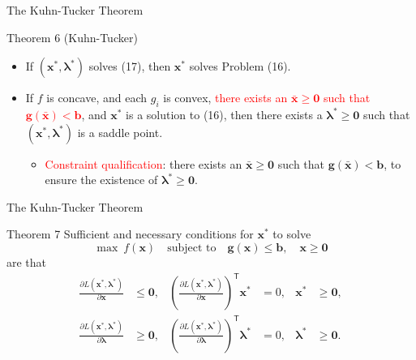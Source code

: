 \documentclass[aspectratio=169,hyperref,UTF8,CJK]{beamer}
\newcommand{\trans}{\mathsf{T}}
\newcommand{\vect}[1]{\boldsymbol{#1}}
\begin{document}
\begin{frame}{The Kuhn-Tucker Theorem}
  \small
  \begin{block}{Theorem 6 (Kuhn-Tucker)}
    \begin{itemize}
      \item If $(\vect{x}^{*},\vect{\lambda}^{*})$ solves (17), then $\vect{x}^{*}$ solves Problem (16).
      \item If $f$ is concave, and each $g_i$ is convex, \textcolor{red}{there exists an $\bar{\vect{x}}\ge\vect{0}$ such that $\vect{g}(\bar{\vect{x}})<\vect{b}$}, and $\vect{x}^{*}$ is a solution to (16), then there exists a $\vect{\lambda}^{*}\ge\vect{0}$ such that $(\vect{x}^{*},\vect{\lambda}^{*})$ is a saddle point.
        \begin{itemize}
          \item \textcolor{red}{Constraint qualification}: there exists an $\bar{\vect{x}}\ge\vect{0}$ such that $\vect{g}(\bar{\vect{x}})<\vect{b}$, to ensure the existence of $\vect{\lambda}^{*}\ge\vect{0}$.
        \end{itemize}
    \end{itemize}
  \end{block}
\end{frame}

\begin{frame}{The Kuhn-Tucker Theorem}
  \small
  \begin{block}{Theorem 7}
    Sufficient and necessary conditions for $\vect{x}^{*}$ to solve
    \begin{equation*}
      \max\ f(\vect{x})\quad\text{subject to}\quad
      \vect{g}(\vect{x})\le\vect{b},\quad\vect{x}\ge\vect{0}
    \end{equation*}
    are that
    \begin{align*}
      \frac{\partial L(\vect{x}^{*},\vect{\lambda}^{*})}{\partial\vect{x}}&\le\vect{0},
      &\left(\frac{\partial L(\vect{x}^{*},\vect{\lambda}^{*})}{\partial\vect{x}}\right)^{\trans}\vect{x}^{*}&=0,
      &\vect{x}^{*}&\ge\vect{0},\\
      \frac{\partial L(\vect{x}^{*},\vect{\lambda}^{*})}{\partial\vect{\lambda}}&\ge\vect{0},
      &\left(\frac{\partial L(\vect{x}^{*},\vect{\lambda}^{*})}{\partial\vect{\lambda}}\right)^{\trans}\vect{\lambda}^{*}&=0,
      &\vect{\lambda}^{*}&\ge\vect{0}.
    \end{align*}
  \end{block}
\end{frame}
\end{document}
